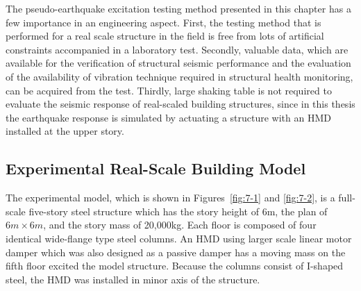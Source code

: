 The pseudo-earthquake excitation testing method presented in this chapter has a few importance in an engineering aspect. First, the testing method that is performed for a real scale structure in the field is free from lots of artificial constraints accompanied in a laboratory test. Secondly, valuable data, which are available for the verification of structural seismic performance and the evaluation of the availability of vibration technique required in structural health monitoring, can be acquired from the test. Thirdly, large shaking table is not required to evaluate the seismic response of real-scaled building structures, since in this thesis the earthquake response is simulated by actuating a structure with an HMD installed at the upper story.

\subsection{Experimental Real-Scale Building Model}
The experimental model, which is shown in Figures~\ref{fig:7-1} and \ref{fig:7-2}, is a full-scale five-story steel structure which has the story height of 6m, the plan of $6m\times6m$, and the story mass of 20,000kg. Each floor is composed of four identical wide-flange type steel columns. An HMD using larger scale linear motor damper which was also designed as a passive damper has a moving mass on the fifth floor excited the model structure. Because the columns consist of I-shaped steel, the HMD was installed in minor axis of the structure.

